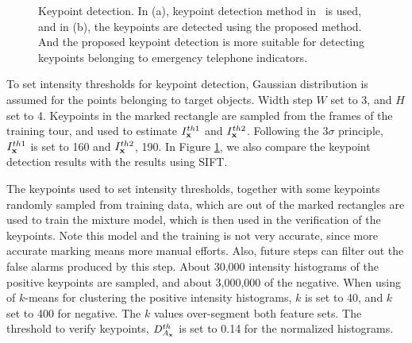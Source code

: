 \begin{figure}
\centering
{}
\caption[Keypoint detection comparison]{Keypoint detection. In (a), keypoint detection method in~\cite{o12} is used, and in (b), the keypoints are detected using the proposed method. And the proposed keypoint detection is more suitable for detecting keypoints belonging to emergency telephone indicators.}
\label{ex1:va}
\end{figure}

To set intensity thresholds for keypoint detection, Gaussian distribution is assumed for the points belonging to target objects. Width step $W$ set to 3, and $H$ set to 4. Keypoints in the marked rectangle are sampled from the frames of the training tour, and used to estimate $I^{th1}_{\bf{x}}$  and $I^{th2}_{\bf{x}}$.  Following the $3\sigma$ principle, $I^{th1}_{\bf{x}}$ is set to 160 and $I^{th2}_{\bf{x}}$, 190. In Figure \ref{ex1:va}, we also compare the keypoint detection results with the results using SIFT.

The keypoints used to set intensity thresholds, together with some keypoints randomly sampled from training data, which are out of the marked rectangles are used to train the mixture model, which is then used in the verification of the keypoints.
 Note this model and the training is not very accurate, since more accurate marking means more manual efforts. Also, future steps can filter out the false alarms produced by this step.  About 30,000 intensity histograms of the positive keypoints are sampled, and about 3,000,000 of the negative. When using of $k$-means for clustering the positive intensity histograms, $k$ is set to 40, and $k$ set to 400 for negative. The $k$ values over-segment both feature sets. The threshold to verify keypoints, $D^{th}_{A_{\bf{x}}}$ is set to 0.14 for the normalized histograms.


